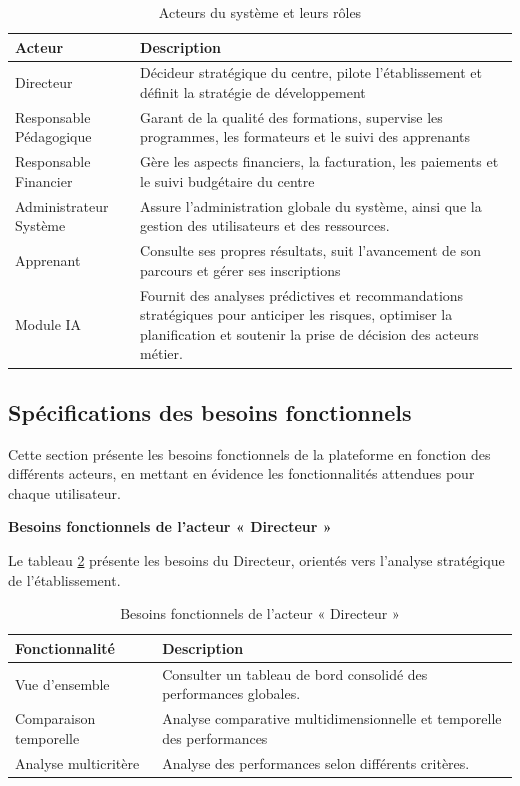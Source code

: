 \begin{table}[h] 
\centering
\caption{Acteurs du système et leurs rôles}
\label{tab:Acteurs du système et leurs rôles}
\begin{tabular}{|p{4.5cm}| p{11cm}|}
\hline
\textbf{Acteur} &  \textbf{Description} \\
\hline
Directeur & Décideur stratégique du centre, pilote l'établissement et définit la stratégie de développement \\
\hline
Responsable Pédagogique & Garant de la qualité des formations, supervise les programmes, les formateurs et le suivi des apprenants\\
\hline
Responsable Financier & Gère les aspects financiers, la facturation, les paiements et le suivi budgétaire du centre \\
\hline
Administrateur Système &Assure l’administration globale du système, ainsi que la gestion des utilisateurs et des ressources.\\
\hline
Apprenant &Consulte ses propres résultats, suit l'avancement de son parcours et gérer ses inscriptions \\
\hline
Module IA &  Fournit des analyses prédictives et recommandations stratégiques pour anticiper les risques, optimiser la planification et soutenir la prise de décision des acteurs métier.  \\
\hline
\end{tabular}
\end{table}
\subsection{Spécifications des besoins fonctionnels}
Cette section présente les besoins fonctionnels de la plateforme en fonction des différents acteurs, en mettant en évidence les fonctionnalités attendues pour chaque utilisateur. 

\vspace{0.3cm}
\noindent\textbf{Besoins fonctionnels de l’acteur « Directeur »}


\noindent Le tableau \ref{tab:Besoins fonctionnels de l’acteur « Directeur »} présente les besoins du Directeur, orientés vers l’analyse stratégique de l'établissement.
\begin{table}[H]
\centering
\caption{Besoins fonctionnels de l’acteur « Directeur »}
\label{tab:Besoins fonctionnels de l’acteur « Directeur »}
\begin{tabular}{|p{4.5cm}| p{11cm}|}
\hline
\textbf{Fonctionnalité} & \textbf{Description} \\
\hline
Vue d'ensemble & Consulter un tableau de bord consolidé des performances globales. \\
\hline
Comparaison temporelle  & Analyse comparative multidimensionnelle et temporelle des performances \\
\hline
Analyse multicritère & Analyse des performances selon différents critères.\\
\hline
\end{tabular}
\end{table}


